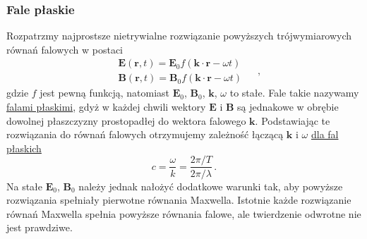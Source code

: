 \documentclass[../main.tex]{subfiles}
\begin{document}
\subsubsection{Fale płaskie}
Rozpatrzmy najprostsze nietrywialne rozwiązanie powyższych trójwymiarowych równań falowych w postaci
\begin{equation*}
\begin{split}
    &\mathbf{E}(\mathbf{r},t)=\mathbf{E}_0f(\mathbf{k}\cdot\mathbf{r}-\omega t)\\
    &\mathbf{B}(\mathbf{r},t)=\mathbf{B}_0f(\mathbf{k}\cdot\mathbf{r}-\omega t)
\end{split}\quad\,,
\end{equation*}
gdzie \(f\) jest pewną funkcją, natomiast \(\mathbf{E}_0\), \(\mathbf{B}_0\), \(\mathbf{k}\),
\(\omega\) to stałe. Fale takie nazywamy \underline{falami płaskimi}, gdyż w każdej chwili wektory
\(\mathbf{E}\) i \(\mathbf{B}\) są jednakowe w obrębie dowolnej płaszczyzny prostopadłej do wektora
falowego \(\mathbf{k}\). Podstawiając te rozwiązania do równań falowych otrzymujemy zależność
łączącą \(\mathbf{k}\) i \(\omega\) \underline{dla fal płaskich}
\begin{equation*}
    c=\frac{\omega}{k}=\frac{2\pi/T}{2\pi/\lambda}\,.
\end{equation*}
Na stałe \(\mathbf{E}_0\), \(\mathbf{B}_0\) należy jednak nałożyć dodatkowe warunki tak, aby
powyższe rozwiązania spełniały pierwotne równania Maxwella. Istotnie każde rozwiązanie równań
Maxwella spełnia powyższe równania falowe, ale twierdzenie odwrotne nie jest prawdziwe.
\medskip
\end{document}
